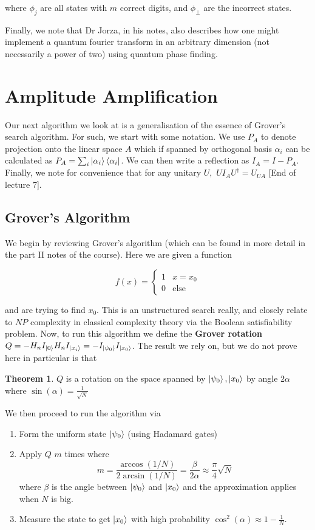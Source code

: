 \documentclass{article}
\theoremstyle{definition}
\newtheorem{theorem}{Theorem}
\begin{document}
where $\phi_j$ are all states with $m$ correct digits, and $\phi_\perp$ are the
incorrect states.

Finally, we note that Dr Jorza, in his notes, also describes how one might
implement a quantum fourier transform in an arbitrary dimension (not necessarily
a power of two) using quantum phase finding.

\section{Amplitude Amplification}

Our next algorithm we look at is a generalisation of the essence of Grover's
search algorithm. For such, we start with some notation. We use $P_A$ to denote
projection onto the linear space $A$ which if spanned by orthogonal basis
$\alpha_i$ can be calculated as $P_A = \sum_i \ket{\alpha_i}\bra{\alpha_i}$. We
can then write a reflection as $I_A = I - P_A$. Finally, we note for convenience
that for any unitary $U,$ $UI_AU^\dagger = U_{UA}$ [End of lecture 7].

\subsection{Grover's Algorithm}

We begin by reviewing Grover's algorithm (which can be found in more detail in
the part II notes of the course). Here we are given a function

$$ f(x) =
\begin{cases}
  1 & x = x_0 \\
  0 & \text{else}
\end{cases} $$

and are trying to find $x_0$. This is an unstructured search really, and closely
relate to $NP$ complexity in classical complexity theory via the Boolean
satisfiability problem. Now, to run this algorithm we define the \textbf{Grover
  rotation} $Q = -H_n I_{\ket{0}} H_n I_{\ket{x_i}} = -I_{\ket{\psi_0}}
I_{\ket{x_0}}$. The result we rely on, but we do not prove here in particular is
that

\begin{theorem}
  $Q$ is a rotation on the space spanned by $\ket{\psi_0}, \ket{x_0}$ by angle
  $2 \alpha$ where $\sin(\alpha) = \frac{1}{\sqrt{N}}$
\end{theorem}

We then proceed to run the algorithm via

\begin{enumerate}
\item Form the uniform state $\ket{\psi_0}$ (using Hadamard gates)
\item Apply $Q$ $m$ times where
$$ m = \frac{\arccos(1 / N)}{2 \arcsin(1 / N)} = \frac{\beta}{2 \alpha} \approx
\frac{\pi}{4} \sqrt{N} $$
where $\beta$ is the angle between $\ket{\psi_0}$ and $\ket{x_0}$ and the
approximation applies when $N$ is big.
\item Measure the state to get $\ket{x_0}$ with high probability $\cos^2(\alpha)
  \approx 1 - \frac{1}{N}$.
\end{enumerate}
\end{document}
